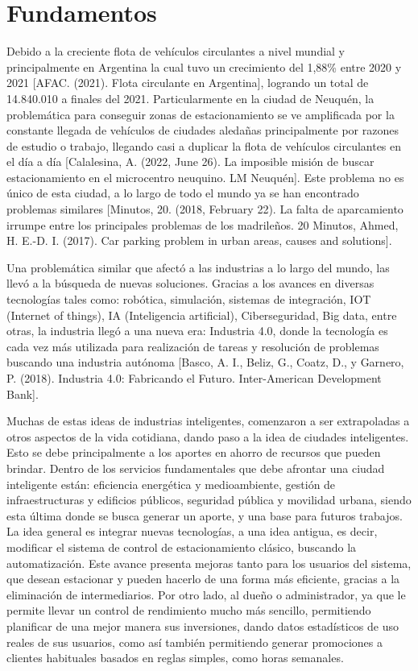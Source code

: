 \section{Fundamentos}

Debido a la creciente flota de vehículos circulantes a nivel mundial y principalmente en Argentina la cual tuvo un crecimiento del 1,88\% entre 2020 y 2021 [AFAC. (2021). Flota circulante en Argentina], logrando un total de 14.840.010 a finales del 2021. Particularmente en la ciudad de Neuquén, la problemática para conseguir zonas de estacionamiento se ve amplificada por la constante llegada de vehículos de ciudades aledañas principalmente por razones de estudio o trabajo, llegando casi a duplicar la flota de vehículos circulantes en el día a día [Calalesina, A. (2022, June 26). La imposible misión de buscar estacionamiento en el microcentro neuquino. LM Neuquén]. Este problema no es único de esta ciudad, a lo largo de todo el mundo ya se han encontrado problemas similares [Minutos, 20. (2018, February 22). La falta de aparcamiento irrumpe entre los principales problemas de los madrileños. 20 Minutos, Ahmed, H. E.-D. I. (2017). Car parking problem in urban areas, causes and solutions].

Una problemática similar que afectó a las industrias a lo largo del mundo, las llevó a la búsqueda de nuevas soluciones. Gracias a los avances  en diversas tecnologías tales como: robótica, simulación, sistemas de integración, IOT (Internet of things), IA (Inteligencia artificial), Ciberseguridad, Big data, entre otras, la industria llegó a una nueva era: Industria 4.0, donde la tecnología es cada vez más utilizada para realización de tareas y resolución de problemas buscando una industria autónoma [Basco, A. I., Beliz, G., Coatz, D., y Garnero, P. (2018). Industria 4.0: Fabricando el Futuro. Inter-American Development Bank].

Muchas de estas ideas de industrias inteligentes, comenzaron a ser extrapoladas a otros aspectos de la vida cotidiana, dando paso a la idea de ciudades inteligentes. Esto se debe principalmente a los aportes en ahorro de recursos que pueden brindar. Dentro de los servicios fundamentales que debe afrontar una ciudad inteligente están: eficiencia energética y medioambiente, gestión de infraestructuras y edificios públicos, seguridad pública y movilidad urbana, siendo esta última  donde se busca generar un aporte, y una base para futuros trabajos. La idea general es integrar nuevas tecnologías, a una idea antigua, es decir, modificar el sistema de control de estacionamiento clásico, buscando la automatización. Este avance presenta mejoras tanto para los usuarios del sistema, que desean estacionar y pueden hacerlo de una forma más eficiente, gracias a la eliminación de intermediarios. Por otro lado, al dueño o administrador, ya que le permite llevar un control de rendimiento mucho más sencillo, permitiendo planificar de una mejor manera sus inversiones, dando datos estadísticos de uso reales de sus usuarios, como así también permitiendo generar promociones a clientes habituales basados en reglas simples, como horas semanales.

